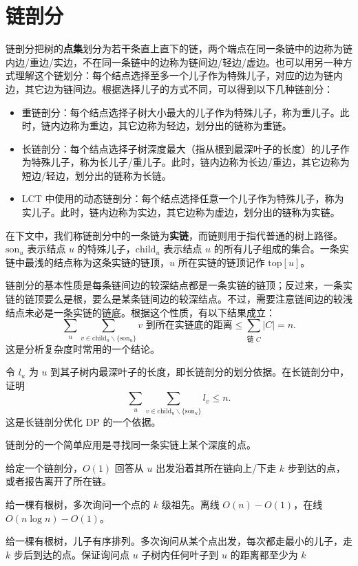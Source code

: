 \section{链剖分}


链剖分把树的\textbf{点集}划分为若干条直上直下的链，两个端点在同一条链中的边称为链内边/重边/实边，不在同一条链中的边称为链间边/轻边/虚边。也可以用另一种方式理解这个链划分：每个结点选择至多一个儿子作为特殊儿子，对应的边为链内边，其它边为链间边。根据选择儿子的方式不同，可以得到以下几种链剖分：

\begin{itemize}
    \item 重链剖分：每个结点选择子树大小最大的儿子作为特殊儿子，称为重儿子。此时，链内边称为重边，其它边称为轻边，划分出的链称为重链。
    \item 长链剖分：每个结点选择子树深度最大（指从根到最深叶子的长度）的儿子作为特殊儿子，称为长儿子/重儿子。此时，链内边称为长边/重边，其它边称为短边/轻边，划分出的链称为长链。
    \item LCT 中使用的动态链剖分：每个结点选择任意一个儿子作为特殊儿子，称为实儿子。此时，链内边称为实边，其它边称为虚边，划分出的链称为实链。
\end{itemize}

在下文中，我们称链剖分中的一条链为\textbf{实链}，而链则用于指代普通的树上路径。$\mathrm{son}_u$ 表示结点 $u$ 的特殊儿子，$\mathrm{child}_u$ 表示结点 $u$ 的所有儿子组成的集合。一条实链中最浅的结点称为这条实链的链顶，$u$ 所在实链的链顶记作 $\mathrm{top}[u]$。

链剖分的基本性质是每条链间边的较深结点都是一条实链的链顶；反过来，一条实链的链顶要么是根，要么是某条链间边的较深结点。不过，需要注意链间边的较浅结点未必是一条实链的链底。根据这个性质，有以下结果成立：
$$
\sum_{u}\sum_{v\in \mathrm{child}_u\backslash \{\mathrm{son}_u\}} v\text{ 到所在实链底的距离}\le \sum_{\text{链 }C}|C|=n.
$$
这是分析复杂度时常用的一个结论。
\begin{exercise}
    令 $l_u$ 为 $u$ 到其子树内最深叶子的长度，即长链剖分的划分依据。在长链剖分中，证明
    $$
    \sum_{u}\sum_{v\in \mathrm{child}_u\backslash \{\mathrm{son}_u\}} l_v\le n.
    $$
    这是长链剖分优化 DP 的一个依据。
\end{exercise}

链剖分的一个简单应用是寻找同一条实链上某个深度的点。
\begin{example}
    给定一个链剖分，$O(1)$ 回答从 $u$ 出发沿着其所在链向上/下走 $k$ 步到达的点，或者报告离开了所在链。
\end{example}
\begin{exercise}[$k$ 级祖先]
    给一棵有根树，多次询问一个点的 $k$ 级祖先。离线 $O(n)-O(1)$，在线 $O(n\log n)-O(1)$。
\end{exercise}
\begin{exercise}
    给一棵有根树，儿子有序排列。多次询问从某个点出发，每次都走最小的儿子，走 $k$ 步后到达的点。保证询问点 $u$ 子树内任何叶子到 $u$ 的距离都至少为 $k$
\end{exercise}


